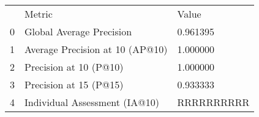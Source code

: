 \begin{tabular}{lll}
 & Metric & Value \\
0 & Global Average Precision & 0.961395 \\
1 & Average Precision at 10 (AP@10) & 1.000000 \\
2 & Precision at 10 (P@10) & 1.000000 \\
3 & Precision at 15 (P@15) & 0.933333 \\
4 & Individual Assessment (IA@10) & RRRRRRRRRR \\
\end{tabular}
